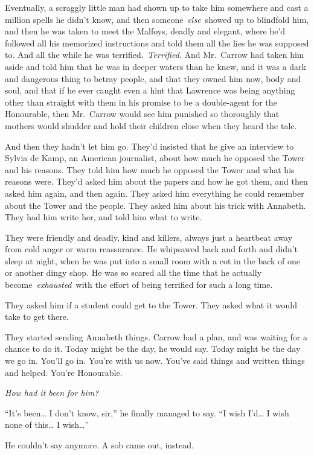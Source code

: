 Eventually, a scraggly little man had shown up to take him somewhere and
cast a million spells he didn't know, and then
someone~\emph{else}~showed up to blindfold him, and then he was taken to
meet the Malfoys, deadly and elegant, where he'd followed all his
memorized instructions and told them all the lies he was supposed to.
And all the while he was terrified.~\emph{Terrified}. And Mr.~Carrow had
taken him aside and told him that he was in deeper waters than he knew,
and it was a dark and dangerous thing to betray people, and that they
owned him now, body and soul, and that if he ever caught even a hint
that Lawrence was being anything other than straight with them in his
promise to be a double-agent for the Honourable, then Mr.~Carrow would
see him punished so thoroughly that mothers would shudder and hold their
children close when they heard the tale.

And then they hadn't let him go. They'd insisted that he give an
interview to Sylvia de Kamp, an American journalist, about how much he
opposed the Tower and his reasons. They told him how much he opposed the
Tower and what his reasons were. They'd asked him about the papers and
how he got them, and then asked him again, and then again. They asked
him everything he could remember about the Tower and the people. They
asked him about his trick with Annabeth. They had him write her, and
told him what to write.

They were friendly and deadly, kind and killers, always just a heartbeat
away from cold anger or warm reassurance. He whipsawed back and forth
and didn't sleep at night, when he was put into a small room with a cot
in the back of one or another dingy shop. He was so scared all the time
that he actually become~\emph{exhausted}~with the effort of being
terrified for such a long time.

They asked him if a student could get to the Tower. They asked what it
would take to get there.

They started sending Annabeth things. Carrow had a plan, and was waiting
for a chance to do it. Today might be the day, he would say. Today might
be the day we go in. You'll go in. You're with us now. You've said
things and written things and helped. You're Honourable.

\emph{How had it been for him?}

``It's been\ldots{} I don't know, sir,'' he finally managed to say. ``I
wish I'd\ldots{} I wish none of this\ldots{} I wish\ldots{}''

He couldn't say anymore. A sob came out, instead.

